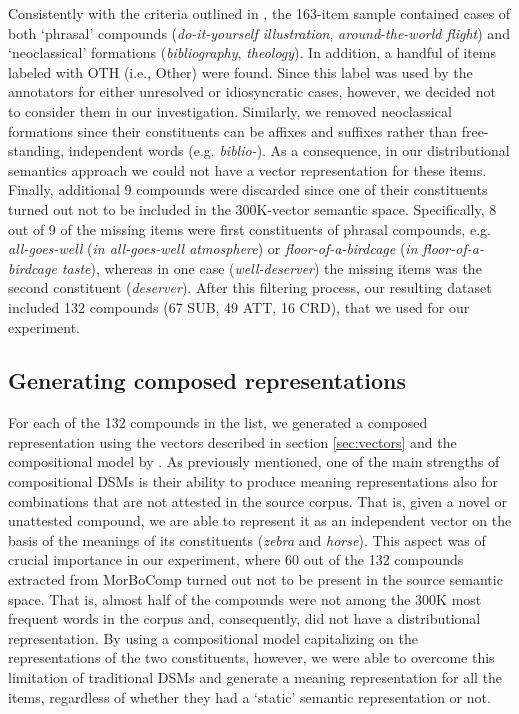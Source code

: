 Consistently with the criteria outlined in \cite{SB2005}, the 163-item sample contained cases of both `phrasal' compounds (\emph{do-it-yourself illustration}, \emph{around-the-world flight}) and `neoclassical' formations (\emph{bibliography}, \emph{theology}). In addition, a handful of items labeled with OTH (i.e., Other) were found. Since this label was used by the annotators for either unresolved or idiosyncratic cases, however, we decided not to consider them in our investigation. Similarly, we removed neoclassical formations since their constituents can be affixes and suffixes rather than free-standing, independent words (e.g. \emph{biblio-}). As a consequence, in our distributional semantics approach we could not have a vector representation for these items. Finally, additional 9 compounds were discarded since one of their constituents turned out not to be included in the 300K-vector semantic space. Specifically, 8 out of 9 of the missing items were first constituents of phrasal compounds, e.g. \emph{all-goes-well} (\emph{in all-goes-well atmosphere}) or \emph{floor-of-a-birdcage} (\emph{in floor-of-a-birdcage taste}), whereas in one case (\emph{well-deserver}) the missing items was the second constituent (\emph{deserver}). After this filtering process, our resulting dataset included 132 compounds (67 SUB, 49 ATT, 16 CRD), that we used for our experiment.


\subsection{Generating composed representations}


For each of the 132 compounds in the list, we generated a composed representation using the vectors described in section \ref{sec:vectors} and the compositional model by \cite{guevara2010}. As previously mentioned, one of the main strengths of compositional DSMs is their ability to produce meaning representations also for combinations that are not attested in the source corpus. That is, given a novel or unattested compound, we are able to represent it as an independent vector on the basis of the meanings of its constituents (\emph{zebra} and \emph{horse}). This aspect was of crucial importance in our experiment, where 60 out of the 132 compounds extracted from MorBoComp turned out not to be present in the source semantic space. That is, almost half of the compounds were not among the 300K most frequent words in the corpus and, consequently, did not have a distributional representation. By using a compositional model capitalizing on the representations of the two constituents, however, we were able to overcome this limitation of traditional DSMs and generate a meaning representation for all the items, regardless of whether they had a `static' semantic representation or not.



